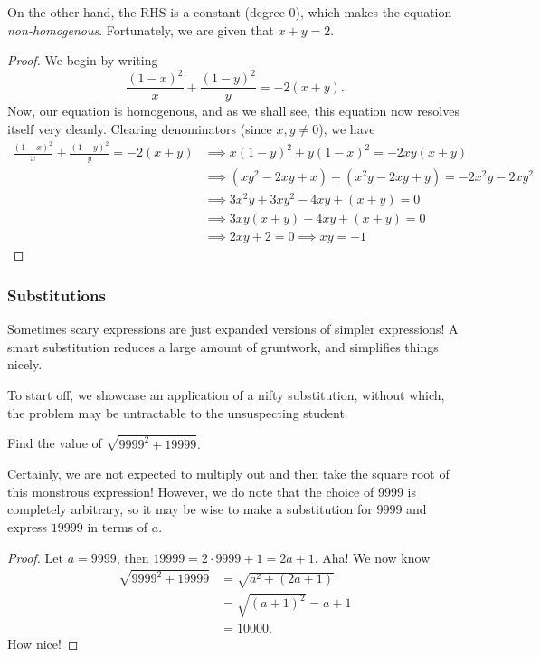 \documentclass[../main.tex]{subfiles}
\begin{document}
On the other hand, the RHS is a constant (degree $0$), which makes the equation \textit{non-homogenous}. Fortunately, we are given that $x+y=2$. 

\begin{proof}
    We begin by writing
$$\frac{(1-x)^2}{x}+\frac{(1-y)^2}{y}=-2(x+y).$$ Now, our equation is homogenous, and as we shall see, this equation now resolves itself very cleanly. Clearing denominators (since $x,y \neq 0$), we have
\begin{align*}
    \frac{(1-x)^2}{x}+\frac{(1-y)^2}{y}=-2(x+y) &\implies x(1-y)^2+y(1-x)^2=-2xy(x+y) \\
    &\implies (xy^2-2xy+x)+(x^2y-2xy+y)=-2x^2y-2xy^2 \\
    &\implies 3x^2y+3xy^2-4xy+(x+y)=0 \\
    &\implies 3xy(x+y)-4xy+(x+y)=0 \\
    &\implies 2xy+2=0 \implies xy=\boxed{-1}
\end{align*}
\end{proof}

\subsubsection{Substitutions}
Sometimes scary expressions are just expanded versions of simpler expressions! A smart substitution reduces a large amount of gruntwork, and simplifies things nicely.

To start off, we showcase an application of a nifty substitution, without which, the problem may be untractable to the unsuspecting student.
\begin{example}[2013 SMO(J) P11]
    Find the value of $\sqrt{9999^2+19999}.$
\end{example}
Certainly, we are not expected to multiply out and then take the square root of this monstrous expression! However, we do note that the choice of $9999$ is completely arbitrary, so it may be wise to make a substitution for $9999$ and express $19999$ in terms of $a$.

\begin{proof}
    Let $a=9999$, then $19999=2\cdot 9999+1=2a+1$. Aha! We now know
\begin{align*}
    \sqrt{9999^2+19999}&=\sqrt{a^2+(2a+1)} \\
    &=\sqrt{(a+1)^2}=a+1 \\
    &=\boxed{10000}.
\end{align*}
How nice!
\end{proof}
\end{document}
